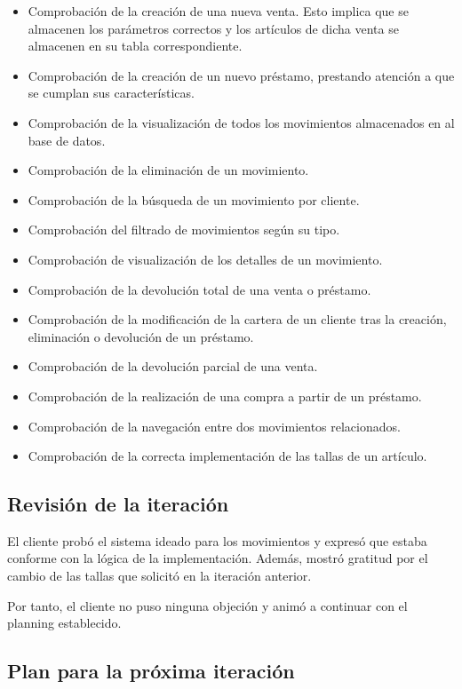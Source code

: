 \begin{itemize}
	\item Comprobación de la creación de una nueva venta. Esto implica que se almacenen los parámetros correctos y los artículos de dicha venta se almacenen en su tabla correspondiente. 
	\item Comprobación de la creación de un nuevo préstamo, prestando atención a que se cumplan sus características. 
	\item Comprobación de la visualización de todos los movimientos almacenados en al base de datos. 
	\item Comprobación de la eliminación de un movimiento. 
	\item Comprobación de la búsqueda de un movimiento por cliente. 
	\item Comprobación del filtrado de movimientos según su tipo. 
	\item Comprobación de visualización de los detalles de un movimiento. 
	\item Comprobación de la devolución total de una venta o préstamo. 
	\item Comprobación de la modificación de la cartera de un cliente tras la creación, eliminación o devolución de un préstamo. 
	\item Comprobación de la devolución parcial de una venta. 
	\item Comprobación de la realización de una compra a partir de un préstamo. 
	\item Comprobación de la navegación entre dos movimientos relacionados. 
	\item Comprobación de la correcta implementación de las tallas de un artículo. 
\end{itemize}


\subsection{Revisión de la iteración}

El cliente probó el sistema ideado para los movimientos y expresó que estaba conforme con la lógica de la implementación. Además, mostró gratitud por el cambio de las tallas que solicitó en la iteración anterior. 

Por tanto, el cliente no puso ninguna objeción y animó a continuar con el planning establecido. 

\subsection{Plan para la próxima iteración}

